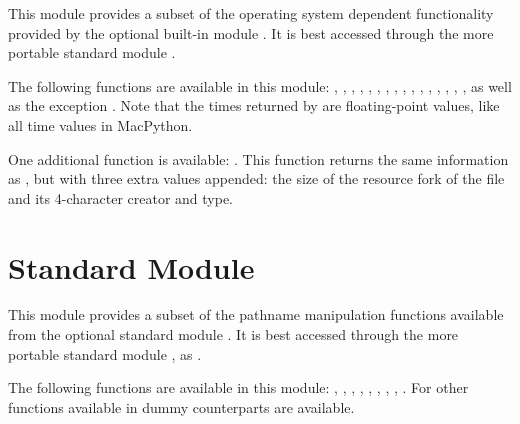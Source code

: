 This module provides a subset of the operating system dependent
functionality provided by the optional built-in module .
It is best accessed through the more portable standard module
.

The following functions are available in this module:
,
,
,
,
,
,
,
,
,
,
,
,
,
,
,
,
as well as the exception . Note that the times
returned by  are floating-point values, like all time
values in MacPython.

One additional function is available: . This function
returns the same information as , but with three extra
values appended: the size of the resource fork of the file and its
4-character creator and type.

\section{Standard Module }
\label{module-macpath}

This module provides a subset of the pathname manipulation functions
available from the optional standard module .  It is
best accessed through the more portable standard module , as
.

The following functions are available in this module:
,
,
,
,
,
,
,
,
.
For other functions available in  dummy counterparts
are available.
